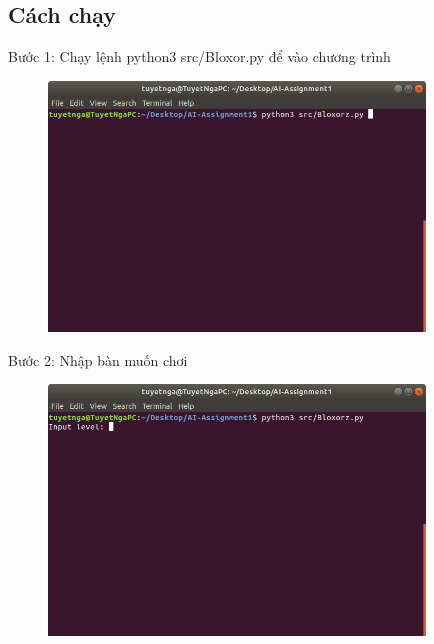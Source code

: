 \documentclass[11pt,a4paper]{article}
\begin{document}
\subsection{Cách chạy} 
\begin{flushleft}
	\hspace{2 cm}	Bước 1: Chạy lệnh python3 src/Bloxor.py để vào chương trình
\end{flushleft}
\begin{center}
	\begin{figure}[htp]
		\begin{center}
			\includegraphics[width=10cm]{Images/depth1.png}
		\end{center}
		\caption{\label{fig:depth1}}
	\end{figure}
\end{center}
\begin{flushleft}
	\hspace{2 cm} Bước 2: Nhập bàn muốn chơi
\end{flushleft}
\begin{center}
	\begin{figure}[htp]
		\begin{center}
			\includegraphics[width=10cm]{Images/depth2.png}
		\end{center}
		\caption{\label{fig:depth2}}
	\end{figure}
\end{center}
\end{document}
